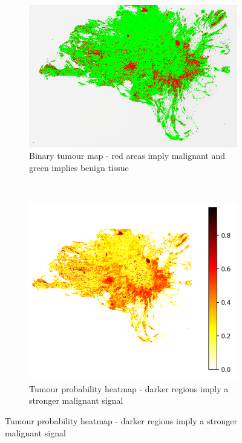 \documentclass{l4proj}
\begin{document}
\begin{appendices}
\begin{figure}[hbt!]
    \centering
    \begin{subfigure}[b]{0.4\textwidth}
        \includegraphics[scale=0.4]{images/appendix_b/TCGA-B6-A0IP-mss.png}
        \vspace{0.5cm}
        \caption{Binary tumour map - red areas imply malignant and green implies benign tissue}
    \end{subfigure}\hfill%
    ~~
    \begin{subfigure}[b]{0.4\textwidth}
        \includegraphics[scale=0.6]{images/appendix_b/TCGA-B6-A0IP-01Z-mmi.png}
        \caption{Tumour probability heatmap - darker regions imply a stronger malignant signal}
    \end{subfigure}


\end{figure}
\end{appendices}
\end{document}
